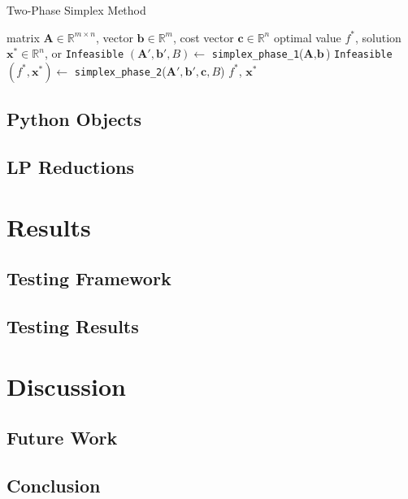 \documentclass[conference]{IEEEtran}
\begin{document}
\begin{algorithm}
    \caption{Two-Phase Simplex Method}
    \label{alg:two_phase}
    \begin{algorithmic}[1]
    \Require matrix $\textbf{A} \in \mathbb{R}^{m \times n}$, vector $\textbf{b} \in \mathbb{R}^{m}$, cost vector $\textbf{c} \in \mathbb{R}^{n}$
    \Ensure optimal value $f^*$, solution $\textbf{x}^* \in \mathbb{R}^n$, or \texttt{Infeasible}
    \State $(\textbf{A}', \textbf{b}', B) \gets$ \texttt{simplex\_phase\_1}($\textbf{A}, \textbf{b}$)
        \State \Return \texttt{Infeasible}
    \EndIf
    \State $(f^*, \textbf{x}^*) \gets$ \texttt{simplex\_phase\_2}($\textbf{A}', \textbf{b}', \textbf{c}, B$)
    \State \Return $f^*$, $\textbf{x}^*$
    \end{algorithmic}
\end{algorithm}
    
\subsection{Python Objects}
\label{Objects}

\subsection{LP Reductions}
\label{Reductions}

\section{Results}
\subsection{Testing Framework}

\subsection{Testing Results}


\section{Discussion}
\subsection{Future Work}
\label{future_work}

\subsection{Conclusion}





\end{document}
